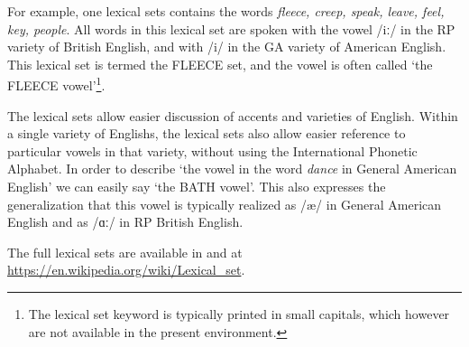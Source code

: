 \documentclass[
]{book}
\begin{document}
For example, one lexical sets contains the words \emph{fleece, creep, speak, leave, feel, key, people}.
All words in this lexical set are spoken with the vowel /iː/ in the RP variety of British English, and with /i/ in the GA variety of American English. This lexical set is termed the FLEECE set, and the vowel is often called `the FLEECE vowel'\footnote{The lexical set keyword is typically printed in small capitals, which however are not available in the present environment.}.

The lexical sets allow easier discussion of accents and varieties of English. Within a single variety of Englishs, the lexical sets also allow easier reference to particular vowels in that variety, without using the International Phonetic Alphabet. In order to describe `the vowel in the word \emph{dance} in General American English' we can easily say `the BATH vowel'. This also expresses the generalization that this vowel is typically realized as /æ/ in General American English and as /ɑː/ in RP British English.

The full lexical sets are available in \citet{Wells_1982} and at
\url{https://en.wikipedia.org/wiki/Lexical_set}.


\end{document}
